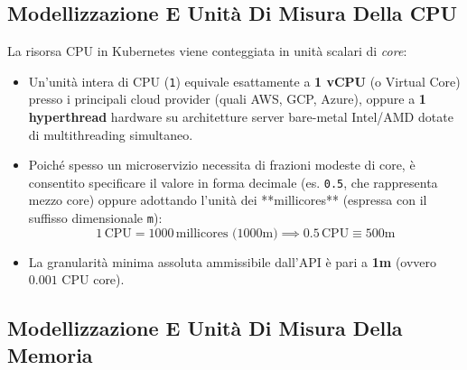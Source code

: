 \documentclass[11pt, a4paper]{article}
\begin{document}
\subsection{Modellizzazione E Unità Di Misura Della CPU}

La risorsa CPU in Kubernetes viene conteggiata in unità scalari di \emph{core}:
\begin{itemize}[noitemsep]
    \item Un'unità intera di CPU (\texttt{1}) equivale esattamente a \textbf{1 vCPU} (o Virtual Core) presso i principali cloud provider (quali AWS, GCP, Azure), oppure a \textbf{1 hyperthread} hardware su architetture server bare-metal Intel/AMD dotate di multithreading simultaneo.
    \item Poiché spesso un microservizio necessita di frazioni modeste di core, è consentito specificare il valore in forma decimale (es. \texttt{0.5}, che rappresenta mezzo core) oppure adottando l'unità dei **millicores** (espressa con il suffisso dimensionale \texttt{m}):
    \[
    1\,\text{CPU} = 1000\,\text{millicores (1000m)} \implies 0.5\,\text{CPU} \equiv 500\text{m}
    \]
    \item La granularità minima assoluta ammissibile dall'API è pari a \textbf{1m} (ovvero $0.001$ CPU core).
\end{itemize}

\subsection{Modellizzazione E Unità Di Misura Della Memoria}
\end{document}
